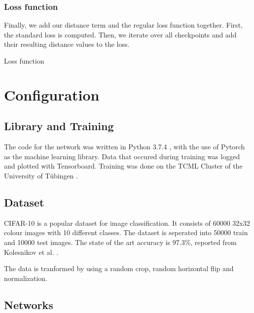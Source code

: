 \subsubsection{Loss function}
Finally, we add our distance term and the regular loss function together. First,
the standard loss is computed. Then, we iterate over all checkpoints and add
their resulting distance values to the loss.
\begin{algorithm}[h!]
    \caption{Loss function}
    \lstset{language=Python}
    
\end{algorithm}



\section{Configuration}

\subsection{Library and Training}
The code for the network was written in Python 3.7.4 , with the use of Pytorch
\cite{NEURIPS2019_9015} as the machine learning library. Data that occured
during training was logged and plotted with Tensorboard. Training was done on
the TCML Cluster of the University of Tübingen \cite{TCML}.

\subsection{Dataset}
CIFAR-10 \cite{CIFAR-10} is a popular dataset for image classification. It
consists of 60000 32x32 colour images with 10 different classes. The dataset is
seperated into 50000 train and 10000 test images. The state of the art accuracy
is 97.3\%, reported from Kolesnikov et al. \cite{kolesnikov2019big}.

The data is tranformed by using a random crop, random horizontal flip and
normalization.


\subsection{Networks}
